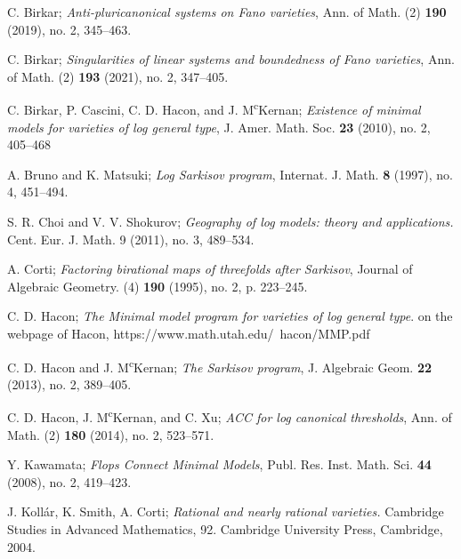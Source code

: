 \documentclass[11pt]{amsart}
\begin{document}
\begin{thebibliography}{99}
   C. Birkar;
  \textit{Anti-pluricanonical systems on Fano varieties}, Ann. of Math. (2) \textbf{190} (2019), no. 2,  345--463.

  C. Birkar;
  \textit{Singularities of linear systems and boundedness of Fano varieties},
  Ann. of Math. (2) \textbf{193} (2021), no. 2, 347–405.

  C. Birkar, P. Cascini, C. D. Hacon, and J. M\textsuperscript{c}Kernan;  \textit{Existence of minimal models for varieties of log general type}, J. Amer. Math. Soc. \textbf{23} (2010), no. 2, 405--468

  A. Bruno and K. Matsuki;
  \textit{Log {S}arkisov program},
  Internat. J. Math. \textbf{8} (1997), no. 4, 451–494.

  S. R. Choi and V. V. Shokurov; \textit{Geography of log models: theory and applications.}
  Cent. Eur. J. Math. 9 (2011), no. 3, 489--534.

   A. Corti;
  \textit{Factoring birational maps of threefolds after {{Sarkisov}}},
  Journal of Algebraic Geometry. (4) \textbf{190} (1995), no. 2, p. 223--245.

  C. D. Hacon;
  \textit{The {{Minimal}} model program for {{varieties}} of log general type}. on the webpage of Hacon, 
  https://www.math.utah.edu/~hacon/MMP.pdf

  C. D. Hacon and J. M\textsuperscript{c}Kernan;
  \textit{The {{Sarkisov}} program},
  J. Algebraic Geom. \textbf{22} (2013), no. 2, 389–405. 

   C. D. Hacon, J. M\textsuperscript{c}Kernan, and C. Xu; \textit{ACC for log canonical thresholds}, Ann. of Math. (2) \textbf{180} (2014), no. 2, 523--571.

  Y. Kawamata;
  \textit{Flops {{Connect Minimal Models}}},
  Publ. Res. Inst. Math. Sci. \textbf{44} (2008), no. 2, 419–423.

  J. Koll\'{a}r, K. Smith, A. Corti; \textit{Rational and nearly rational varieties.} Cambridge Studies in Advanced Mathematics, 92. Cambridge University Press, Cambridge, 2004.


\end{thebibliography}
\end{document}
